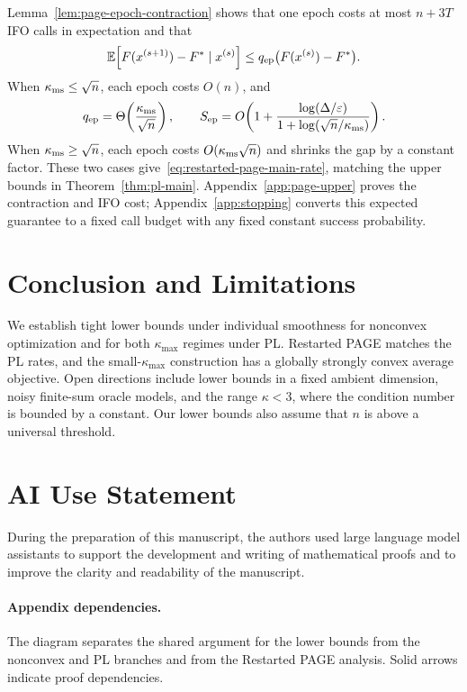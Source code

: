 \documentclass{article}
\newcommand{\E}{\mathbb{E}}
\theoremstyle{definition}
\begin{document}
Lemma~\ref{lem:page-epoch-contraction} shows that one epoch costs at most
$n+3T$ IFO calls in expectation and that
\begin{equation}
 \E\!\left[F(x^{(s+1)})-F^*\mid x^{(s)}\right]
 \le q_{\rm ep}\bigl(F(x^{(s)})-F^*\bigr).
 \label{eq:page-main-contraction}
\end{equation}
When $\kappa_{\rm ms}\le\sqrt n$, each epoch costs $O(n)$, and
\begin{equation*}
 q_{\rm ep}=\Theta\!\left(\frac{\kappa_{\rm ms}}{\sqrt n}\right),
 \qquad
 S_{\rm ep}=O\!\left(
 1+\frac{\log(\Delta/\varepsilon)}
 {1+\log(\sqrt n/\kappa_{\rm ms})}
 \right).
\end{equation*}
When $\kappa_{\rm ms}\ge\sqrt n$, each epoch costs
$O(\kappa_{\rm ms}\sqrt n)$ and shrinks the gap by a constant factor.
These two cases give~\eqref{eq:restarted-page-main-rate}, matching the upper
bounds in Theorem~\ref{thm:pl-main}.  Appendix~\ref{app:page-upper} proves the
contraction and IFO cost; Appendix~\ref{app:stopping} converts this expected
guarantee to a fixed call budget with any fixed constant success probability.

\section{Conclusion and Limitations}
\label{sec:limitations}

We establish tight lower bounds under individual smoothness for nonconvex
optimization and for both $\kappa_{\max}$ regimes under PL.  Restarted PAGE
matches the PL rates, and the small-$\kappa_{\max}$ construction has a globally
strongly convex average objective.  Open directions include lower bounds in a
fixed ambient dimension, noisy finite-sum oracle models, and the range
$\kappa<3$, where the condition number is bounded by a constant.  Our lower
bounds also assume that $n$ is above a universal threshold.


\clearpage



\section*{AI Use Statement}
During the preparation of this manuscript, the authors used large language
model assistants to support the development and writing of mathematical proofs
and to improve the clarity and readability of the manuscript.

\clearpage
\appendix
\paragraph{Appendix dependencies.}
The diagram separates the shared argument for the lower bounds from the nonconvex and PL
branches and from the Restarted PAGE analysis.  Solid arrows indicate proof
dependencies.
\end{document}

